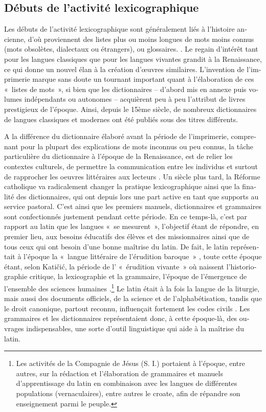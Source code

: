 \documentclass[output=paper,colorlinks,citecolor=brown,arabicfont,chinesefont,booklanguage=french]{langscibook}
\begin{document}
\begin{otherlanguage}{french}
\section{Débuts de l’activité lexicographique}

Les débuts de l’activité lexicographique sont généralement liés à l’histoire ancienne, d’où proviennent des listes plus ou moins longues de mots moins connus (mots obsolètes, dialectaux ou étrangers), ou glossaires. \citep[9]{Samardzija2019}. Le regain d’intérêt tant pour les langues classiques que pour les langues vivantes grandit à la Renaissance, ce qui donne un nouvel élan à la création d’œuvres similaires. L’invention de l’imprimerie marque sans doute un tournant important quant à l’élaboration de ces «~listes de mots~», si bien que les dictionnaires – d’abord mis en annexe puis volumes indépendants ou autonomes – acquièrent peu à peu l’attribut de livres prestigieux de l’époque. Ainsi, depuis le 15ème siècle, de nombreux dictionnaires de langues classiques et modernes ont été publiés sous des titres différents.

A la différence du dictionnaire élaboré avant la période de l’imprimerie, comprenant pour la plupart des explications de mots inconnus ou peu connus, la tâche particulière du dictionnaire à l’époque de la Renaissance, est de relier les contextes culturels, de permettre la communication entre les individus et surtout de rapprocher les oeuvres littéraires aux lecteurs \citep{Samardzija2019}. Un siècle plus tard, la Réforme catholique va radicalement changer la pratique lexicographique ainsi que la finalité des dictionnaires, qui ont depuis lors une part active en tant que supports au service pastoral. \citep[42]{Katicic1981} C’est ainsi que les premiers manuels, dictionnaires et grammaires sont confectionnés justement pendant cette période. En ce temps-là, c’est par rapport au latin que les langues «~se mesurent~», l’objectif étant de répondre, en premier lieu, aux besoins éducatifs des élèves et des missionnaires ainsi que de tous ceux qui ont besoin d'une bonne maîtrise du latin. De fait, le latin représentait à l’époque la «~langue littéraire de l’érudition baroque~» \citep[13]{Katicic2013}, toute cette époque étant, selon Katičić, la période de l’ «~érudition vivante~» où naissent l’historiographie critique, la lexicographie et la grammaire, l’époque de l’émergence de l’ensemble des sciences humaines \citep{Katicic2013}.\footnote{Les activités de la Compagnie de Jésus (S. I.) portaient à l’époque, entre autres, sur la rédaction et l’élaboration de grammaires et manuels d’apprentissage du latin en combinaison avec les langues de différentes populations (vernaculaires), entre autres le croate, afin de répandre son enseignement parmi le peuple.}  Le latin était à la fois la langue de la liturgie, mais aussi des documents officiels, de la science et de l’alphabétisation, tandis que le droit canonique, partout reconnu, influençait fortement les codes civils \citep[19]{Krasic2009}. Les grammaires et les dictionnaires représentaient donc, à cette époque-là, des ouvrages indispensables, une sorte d’outil linguistique qui aide à la maîtrise du latin.


\end{otherlanguage}
\end{document}
